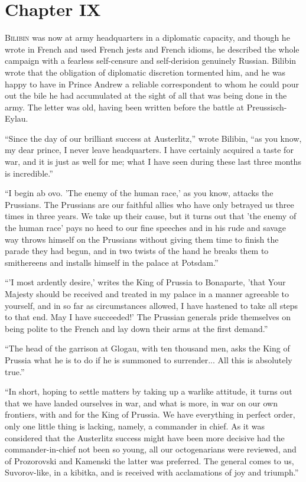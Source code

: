 \chapter*{Chapter IX}
\ifaudio     
{} 
\fi

\lettrine[lines=2, loversize=0.3, lraise=0]{\initfamily B}{ilibin}
was now at army headquarters in a diplomatic capacity,
and though he wrote in French and used French jests and French
idioms, he described the whole campaign with a fearless
self-censure and self-derision genuinely Russian. Bilibin wrote
that the obligation of diplomatic discretion tormented him, and
he was happy to have in Prince Andrew a reliable correspondent to
whom he could pour out the bile he had accumulated at the sight
of all that was being done in the army. The letter was old,
having been written before the battle at Preussisch-Eylau.

``Since the day of our brilliant success at Austerlitz,'' wrote
Bilibin, ``as you know, my dear prince, I never leave
headquarters. I have certainly acquired a taste for war, and it
is just as well for me; what I have seen during these last three
months is incredible.''

``I begin ab ovo. 'The enemy of the human race,' as you know,
attacks the Prussians. The Prussians are our faithful allies who
have only betrayed us three times in three years. We take up
their cause, but it turns out that 'the enemy of the human race'
pays no heed to our fine speeches and in his rude and savage way
throws himself on the Prussians without giving them time to
finish the parade they had begun, and in two twists of the hand
he breaks them to smithereens and installs himself in the palace
at Potsdam.''

``'I most ardently desire,' writes the King of Prussia to
Bonaparte, 'that Your Majesty should be received and treated in
my palace in a manner agreeable to yourself, and in so far as
circumstances allowed, I have hastened to take all steps to that
end. May I have succeeded!' The Prussian generals pride
themselves on being polite to the French and lay down their arms
at the first demand.''

``The head of the garrison at Glogau, with ten thousand men, asks
the King of Prussia what he is to do if he is summoned to
surrender... All this is absolutely true.''

``In short, hoping to settle matters by taking up a warlike
attitude, it turns out that we have landed ourselves in war, and
what is more, in war on our own frontiers, with and for the King
of Prussia. We have everything in perfect order, only one little
thing is lacking, namely, a commander in chief. As it was
considered that the Austerlitz success might have been more
decisive had the commander-in-chief not been so young, all our
octogenarians were reviewed, and of Prozorovski and Kamenski the
latter was preferred. The general comes to us, Suvorov-like, in a
kibitka, and is received with acclamations of joy and triumph.''

